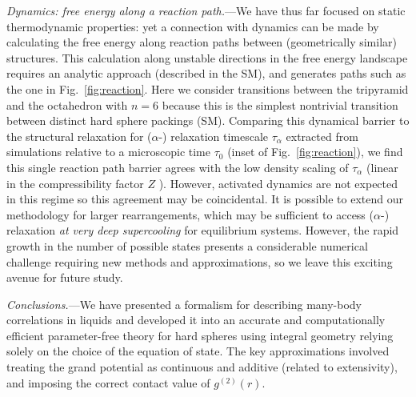 \documentclass[11pt,twoside]{report}
\begin{document}
\emph{Dynamics: free energy along a reaction path.}---We have thus far focused on static thermodynamic properties: yet a connection with dynamics can be made by calculating the free energy along reaction paths between (geometrically similar) structures.
This calculation along unstable directions in the free energy landscape requires an analytic approach (described in the SM), and generates paths such as the one in Fig.\ \ref{fig:reaction}.
Here we consider transitions between the tripyramid and the octahedron with $n=6$ because this is the simplest nontrivial transition between distinct hard sphere packings (SM).
Comparing this dynamical barrier to the structural relaxation for ($\alpha$-) relaxation timescale $\tau_\alpha$ extracted from simulations relative to a microscopic time $\tau_0$ (inset of Fig.\ \ref{fig:reaction}), we find this single reaction path barrier agrees with the low density scaling of $\tau_\alpha$ (linear in the compressibility factor $Z$ \cite{Berthier2009}).
However, activated dynamics are not expected in this regime so this agreement may be coincidental.
It is possible to extend our methodology for larger rearrangements, which may be sufficient to access ($\alpha$-) relaxation \emph{at very deep supercooling} for equilibrium systems.
However, the rapid growth in the number of possible states presents a considerable numerical challenge requiring new methods and approximations, so we leave this exciting avenue for future study.

\emph{Conclusions.}---We have presented a formalism for describing many-body correlations in liquids and developed it into an accurate and computationally efficient parameter-free theory for hard spheres using integral geometry relying solely on the choice of the equation of state.
The key approximations involved treating the grand potential as continuous and additive (related to extensivity), and imposing the correct contact value of $g^{(2)}(r)$.
\end{document}
